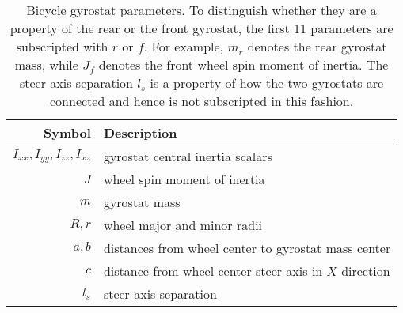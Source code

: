 \begin{table}[h]
  \centering
  \begin{tabular}{rl}
    \toprule
    Symbol & Description \\
    \midrule
    $I_{xx}, I_{yy}, I_{zz}, I_{xz}$ & gyrostat central inertia scalars \\
    $J$ & wheel spin moment of inertia \\
    $m$ & gyrostat mass \\
    $R, r$ & wheel major and minor radii \\
    $a, b$ & distances from wheel center to gyrostat mass center \\
    $c$ & distance from wheel center steer axis in $X$ direction \\
    $l_s$ & steer axis separation \\
    \bottomrule
  \end{tabular}
  \caption[Bicycle gyrostat parameters.]{Bicycle gyrostat parameters. To
    distinguish whether they are a property of the rear or the front gyrostat,
    the first 11 parameters are subscripted with $r$ or $f$. For example, $m_r$
    denotes the rear gyrostat mass, while $J_f$ denotes the front wheel spin
    moment of inertia. The steer axis separation $l_s$ is a property of how the
    two gyrostats are connected and hence is not subscripted in this fashion.}
  \label{model:tab:parameters}
\end{table}
